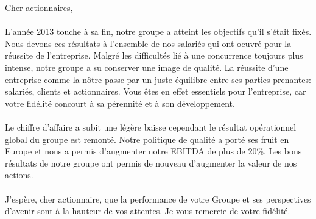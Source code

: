 Cher actionnaires,\\

\begin{minipage}[t]{0.42\textwidth}
\paragraph{} L'année 2013 touche à sa fin, notre groupe a atteint les objectifs qu'il s'était fixés.
	 Nous devons ces résultats à l'ensemble de nos salariés qui ont oeuvré pour la réussite de l'entreprise.
	 Malgré les difficultés lié à une concurrence toujours plus intense, notre groupe a su conserver une image de qualité.
	 La réussite d'une entreprise comme la nôtre passe par un juste équilibre entre ses parties prenantes: salariés, clients et actionnaires.
	 Vous êtes en effet essentiels pour l’entreprise, car votre fidélité concourt à sa pérennité et à son développement. 

\end{minipage}
\hspace*{0.1\textwidth}
\begin{minipage}[t]{0.42\textwidth}
\paragraph{} Le chiffre d'affaire a subit une légère baisse cependant le résultat opérationnel global du groupe est remonté.
	 Notre politique de qualité a porté ses fruit en Europe et nous a permis d'augmenter notre EBITDA de plus de 20\%.
	 Les bons résultats de notre groupe ont permis de nouveau d'augmenter la valeur de nos actions.\\

\paragraph{} J’espère, cher actionnaire, que la performance de votre Groupe et ses perspectives d’avenir sont à la hauteur de vos attentes.
	 Je vous remercie de votre fidélité.
\end{minipage}



